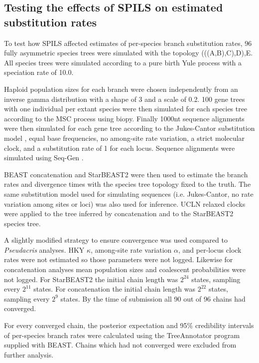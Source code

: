 \documentclass[12pt]{article}
\begin{document}
\subsection{Testing the effects of SPILS on estimated substitution rates}

To test how SPILS affected estimates of per-species branch substitution rates,
96 fully asymmetric species trees were simulated with the topology
(((A,B),C),D),E. All species trees were simulated according to a pure birth Yule
process \citep{Yule21} with a speciation rate of 10.0.

Haploid population sizes for each branch were chosen independently from an
inverse gamma distribution with a shape of 3 and a scale of 0.2. 100 gene trees
with one individual per extant species were then simulated for each species tree
according to the MSC process using biopy. Finally 1000nt sequence alignments
were then simulated for each gene tree according to the Jukes-Cantor
substitution model \citep{JUKES196921}, equal base frequencies, no among-site
rate variation, a strict molecular clock, and a substitution rate of 1 for each
locus. Sequence alignments were simulated using Seq-Gen \citep{Rambaut01061997}.

BEAST concatenation and StarBEAST2 were then used to estimate the branch rates
and divergence times with the species tree topology fixed to the truth. The same
substitution model used for simulating sequences (i.e. Jukes-Cantor, no rate
variation among sites or loci) was also used for inference. UCLN relaxed
clocks were applied to the tree inferred by concatenation and to the
StarBEAST2 species tree.

A slightly modified strategy to ensure convergence was used compared to
\textit{Pseudacris} analyses. HKY $\kappa$, among-site rate variation $\alpha$,
and per-locus clock rates were not estimated so those parameters were not
logged. Likewise for concatenation analyses mean population sizes and coalescent
probabilities were not logged. For StarBEAST2 the initial chain length was
$2^{24}$ states, sampling every $2^{11}$ states. For concatenation the initial
chain length was $2^{22}$ states, sampling every $2^{9}$ states. By the time of
submission all 90 out of 96 chains had converged.

For every converged chain, the posterior expectation and 95\% credibility
intervals of per-species branch rates were calculated using the TreeAnnotator
program supplied with BEAST. Chains which had not converged were excluded from
further analysis.
\end{document}
